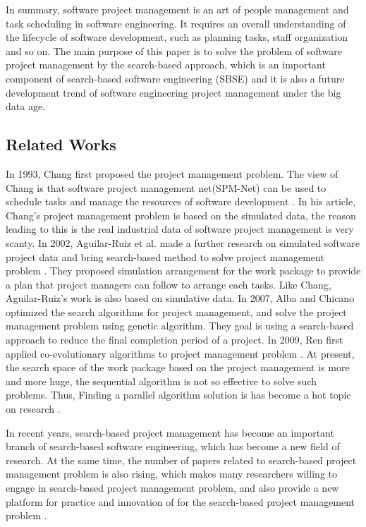 In summary, software project management is an art of people management and task
scheduling in software engineering. It requires an overall understanding of the
lifecycle of software development, such as planning tasks, staff organization
and so on. The main purpose of this paper is to solve the problem of software
project management by the search-based approach, which is an important component
of search-based software engineering (SBSE) and it is also a future development
trend of software engineering project management under the big data age.


\subsection{Related Works}
%
In 1993, Chang first proposed the project management problem. The view of Chang
is that software project management net(SPM-Net) can be used to schedule tasks
and manage the resources of software development \cite{chang}. In his article,
Chang's project management problem is based on the simulated data, the reason
leading to this is the real industrial data of software project management is
very scanty. In 2002, Aguilar-Ruiz et al. made a further research on simulated
software project data and bring search-based method to solve project management
problem \cite{alba}. They proposed simulation arrangement for the work package
to provide a plan that project managers can follow to arrange each tasks. Like
Chang, Aguilar-Ruiz's work is also based on simulative data. In 2007, Alba and
Chicano optimized the search algorithms for project management, and solve the
project management problem using genetic algorithm. They goal is using a
search-based approach to reduce the final completion period of a project. In
2009, Ren first applied co-evolutionary algorithms to project management problem
\cite{ren}. At present, the search space of the work package based on the
project management is more and more huge, the sequential algorithm is not so
effective to solve such problems. Thus, Finding a parallel algorithm solution is
has become a hot topic on research \cite{pentico}.


In recent years, search-based project management has become an important branch
of search-based software engineering, which has become a new field of
research. At the same time, the number of papers related to search-based project
management problem is also rising, which makes many researchers willing to
engage in search-based project management problem, and also provide a new
platform for practice and innovation of for the search-based project management
problem \cite{penta}.



